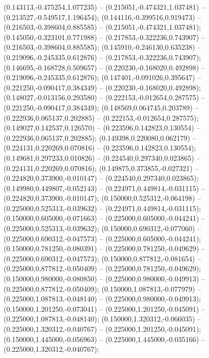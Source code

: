  (0.143113,-0.475254,1.077235) -- (0.215051,-0.474321,1.037481) -- (0.213527,-0.549517,1.196454);
 (0.144116,-0.399516,0.919473) -- (0.216503,-0.398604,0.885585) -- (0.215051,-0.474321,1.037481);
 (0.145050,-0.323101,0.771988) -- (0.217853,-0.322236,0.743907) -- (0.216503,-0.398604,0.885585);
 (0.145910,-0.246130,0.635238) -- (0.219096,-0.245335,0.612876) -- (0.217853,-0.322236,0.743907);
 (0.146695,-0.168728,0.509657) -- (0.220230,-0.168020,0.492898) -- (0.219096,-0.245335,0.612876);
 (0.147401,-0.091026,0.395647) -- (0.221250,-0.090417,0.384349) -- (0.220230,-0.168020,0.492898);
 (0.148027,-0.013156,0.293580) -- (0.222153,-0.012654,0.287575) -- (0.221250,-0.090417,0.384349);
 (0.148569,0.064745,0.203789) -- (0.222936,0.065137,0.202885) -- (0.222153,-0.012654,0.287575);
 (0.149027,0.142537,0.126570) -- (0.223596,0.142823,0.130554) -- (0.222936,0.065137,0.202885);
 (0.149398,0.220080,0.062179) -- (0.224131,0.220269,0.070816) -- (0.223596,0.142823,0.130554);
 (0.149681,0.297233,0.010826) -- (0.224540,0.297340,0.023865) -- (0.224131,0.220269,0.070816);
 (0.149875,0.373855,-0.027321) -- (0.224820,0.373900,-0.010147) -- (0.224540,0.297340,0.023865);
 (0.149980,0.449807,-0.052143) -- (0.224971,0.449814,-0.031115) -- (0.224820,0.373900,-0.010147);
 (0.150000,0.525312,-0.064198) -- (0.225000,0.525313,-0.039632) -- (0.224971,0.449814,-0.031115);
 (0.150000,0.605000,-0.071663) -- (0.225000,0.605000,-0.044241) -- (0.225000,0.525313,-0.039632);
 (0.150000,0.690312,-0.077060) -- (0.225000,0.690312,-0.047573) -- (0.225000,0.605000,-0.044241);
 (0.150000,0.781250,-0.080391) -- (0.225000,0.781250,-0.049629) -- (0.225000,0.690312,-0.047573);
 (0.150000,0.877812,-0.081654) -- (0.225000,0.877812,-0.050409) -- (0.225000,0.781250,-0.049629);
 (0.150000,0.980000,-0.080850) -- (0.225000,0.980000,-0.049913) -- (0.225000,0.877812,-0.050409);
 (0.150000,1.087813,-0.077979) -- (0.225000,1.087813,-0.048140) -- (0.225000,0.980000,-0.049913);
 (0.150000,1.201250,-0.073041) -- (0.225000,1.201250,-0.045091) -- (0.225000,1.087813,-0.048140);
 (0.150000,1.320312,-0.066035) -- (0.225000,1.320312,-0.040767) -- (0.225000,1.201250,-0.045091);
 (0.150000,1.445000,-0.056963) -- (0.225000,1.445000,-0.035166) -- (0.225000,1.320312,-0.040767);
